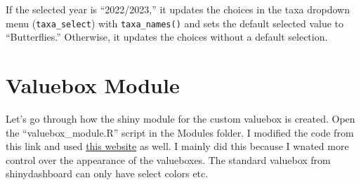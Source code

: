 \documentclass[
]{book}
\newenvironment{Shaded}{\begin{snugshade}}{\end{snugshade}}
\newcommand{\AttributeTok}[1]{\textcolor[rgb]{0.13,0.29,0.53}{#1}}
\newcommand{\ConstantTok}[1]{\textcolor[rgb]{0.56,0.35,0.01}{#1}}
\newcommand{\ControlFlowTok}[1]{\textcolor[rgb]{0.13,0.29,0.53}{\textbf{#1}}}
\newcommand{\FunctionTok}[1]{\textcolor[rgb]{0.13,0.29,0.53}{\textbf{#1}}}
\newcommand{\NormalTok}[1]{#1}
\newcommand{\SpecialCharTok}[1]{\textcolor[rgb]{0.81,0.36,0.00}{\textbf{#1}}}
\newcommand{\StringTok}[1]{\textcolor[rgb]{0.31,0.60,0.02}{#1}}
\begin{document}
\begin{Shaded}
\end{Shaded}

If the selected year is ``2022/2023,'' it updates the choices in the taxa dropdown menu (\texttt{taxa\_select}) with \texttt{taxa\_names()} and sets the default selected value to ``Butterflies.'' Otherwise, it updates the choices without a default selection.

\begin{Shaded}
\end{Shaded}

\hypertarget{valuebox-module}{%
\section{Valuebox Module}\label{valuebox-module}}

Let's go through how the shiny module for the custom valuebox is created. Open the ``valuebox\_module.R'' script in the Modules folder. I modified the code from this link and used \href{https://jkunst.com/blog/posts/2020-06-26-valuebox-and-sparklines/}{this website} as well. I mainly did this because I wnated more control over the appearance of the valueboxes. The standard valuebox from shinydashboard can only have select colors etc.
\end{document}
